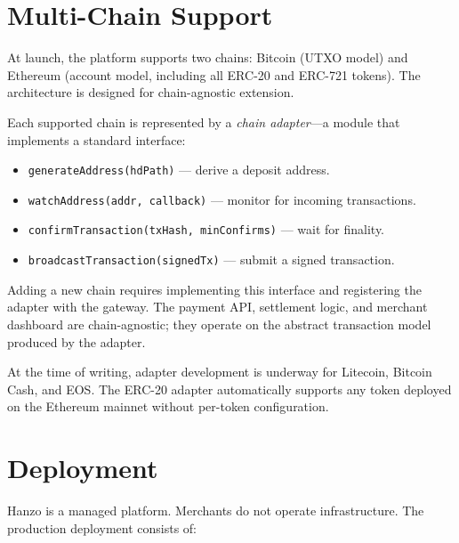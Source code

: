 \documentclass[11pt,letterpaper]{article}
\begin{document}
\section{Multi-Chain Support}
\label{sec:multichain}

At launch, the platform supports two chains: Bitcoin (UTXO model) and
Ethereum (account model, including all ERC-20 and ERC-721 tokens).  The
architecture is designed for chain-agnostic extension.

Each supported chain is represented by a \emph{chain adapter}---a module that
implements a standard interface:

\begin{itemize}[leftmargin=1.1em]
    \item \texttt{generateAddress(hdPath)} --- derive a deposit address.
    \item \texttt{watchAddress(addr, callback)} --- monitor for incoming
    transactions.
    \item \texttt{confirmTransaction(txHash, minConfirms)} --- wait for
    finality.
    \item \texttt{broadcastTransaction(signedTx)} --- submit a signed
    transaction.
\end{itemize}

Adding a new chain requires implementing this interface and registering the
adapter with the gateway.  The payment API, settlement logic, and merchant
dashboard are chain-agnostic; they operate on the abstract transaction model
produced by the adapter.

At the time of writing, adapter development is underway for Litecoin,
Bitcoin Cash, and EOS.  The ERC-20 adapter automatically supports any token
deployed on the Ethereum mainnet without per-token configuration.

\section{Deployment}
\label{sec:deployment}

Hanzo is a managed platform.  Merchants do not operate infrastructure.  The
production deployment consists of:
\end{document}
